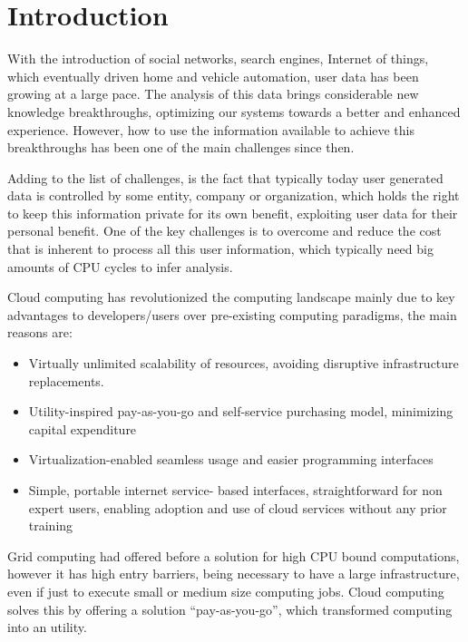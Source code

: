 
% 
% 

\section{Introduction}

With the introduction of social networks, search engines, Internet of things, which eventually driven home and vehicle automation, user data has been growing at a large pace. The analysis of this data brings considerable new knowledge breakthroughs, optimizing our systems towards a better and enhanced experience. However, how to use the information available to achieve this breakthroughs has been one of the main challenges since then. 

Adding to the list of challenges, is the fact that typically today user generated data is controlled by some entity, company or organization, which holds the right to keep this information private for its own benefit, exploiting user data for their personal benefit. One of the key challenges is to overcome and reduce the cost that is inherent to process all this user information, which typically need big amounts of CPU cycles to infer analysis.

Cloud computing has revolutionized the computing landscape mainly due to key advantages to developers/users over pre-existing computing paradigms, the main reasons are:
\begin{itemize}
  \item Virtually unlimited scalability of resources, avoiding disruptive infrastructure replacements.
  \item Utility-inspired pay-as-you-go and self-service purchasing model, minimizing capital expenditure
  \item Virtualization-enabled seamless usage and easier programming interfaces
  \item Simple, portable internet service- based interfaces, straightforward for non expert users, enabling adoption and use of cloud services without any prior training
 \end{itemize} 

Grid computing had offered before a solution for high CPU bound computations, however it has high entry barriers, being necessary to have a large infrastructure, even if just to execute small or medium size computing jobs. Cloud computing solves this by offering a solution ``pay-as-you-go'', which transformed computing into an utility.

